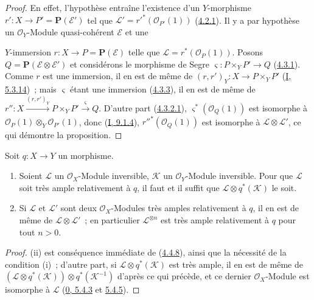 \begin{proof}
En effet, l'hypothèse entraîne l'existence d'un $Y$-morphisme
$r':X\to P'=\mathbf{P}(\mathcal{E}')$ tel que
$\mathcal{L}'=r'^*(\mathcal{O}_{P'}(1))$
(\hyperref[II.4.2.1-fr]{4.2.1}). Il y a par hypothèse un
$\mathcal{O}_Y$-Module quasi-cohérent $\mathcal{E}$ et une


$Y$-immersion $r:X\to P=\mathbf{P}(\mathcal{E})$ telle que
$\mathcal{L}=r^*(\mathcal{O}_P(1))$. Posons
$Q=\mathbf{P}(\mathcal{E}\otimes\mathcal{E}')$ et considérons le morphisme de
Segre $\varsigma:P\times_YP'\to Q$ (\hyperref[II.4.3.1-fr]{4.3.1}). Comme
$r$ est une immersion, il en est de même de
$(r,r')_Y:X\to P\times_YP'$ (\hyperref[I.5.3.14-fr]{I, 5.3.14})~; mais
$\varsigma$ étant une immersion (\hyperref[II.4.3.3-fr]{4.3.3}), il en est de
même de
$r'':X\xrightarrow{(r,r')_Y}P\times_YP'\xrightarrow{\varsigma}Q$. D'autre
part (\hyperref[II.4.3.2.1-fr]{4.3.2.1}),
$\varsigma^*(\mathcal{O}_Q(1))$ est isomorphe à
$\mathcal{O}_P(1)\otimes_Y\mathcal{O}_{P'}(1)$, donc
(\hyperref[I.9.1.4-fr]{I, 9.1.4}), $r''^*(\mathcal{O}_Q(1))$ est isomorphe à
$\mathcal{L}\otimes\mathcal{L}'$, ce qui démontre la proposition.
\end{proof}

\begin{corollary}[4.4.9]
\label{II.4.4.9-fr}
Soit $q:X\to Y$ un morphisme.
\begin{enumerate}
  \item[\rm{(i)}] Soient $\mathcal{L}$ un $\mathcal{O}_X$-Module inversible,
  $\mathcal{K}$ un $\mathcal{O}_Y$-Module inversible. Pour que $\mathcal{L}$
  soit très ample relativement à $q$, il faut et il suffit que
  $\mathcal{L}\otimes q^*(\mathcal{K})$ le soit.
  \item[\rm{(ii)}] Si $\mathcal{L}$ et $\mathcal{L}'$ sont deux
  $\mathcal{O}_X$-Modules très amples relativement à $q$, il en est de même
  de $\mathcal{L}\otimes\mathcal{L}'$~; en particulier
  $\mathcal{L}^{\otimes n}$ est très ample relativement à $q$ pour tout
  $n>0$.
\end{enumerate}
\end{corollary}

\begin{proof}
(ii) est conséquence immédiate de (\hyperref[II.4.4.8-fr]{4.4.8}), ainsi que
la nécessité de la condition (i)~; d'autre part, si
$\mathcal{L}\otimes q^*(\mathcal{K})$ est très ample, il en est de même de
$(\mathcal{L}\otimes q^*(\mathcal{K}))\otimes q^*(\mathcal{K}^{-1})$
d'après ce qui précède, et ce dernier $\mathcal{O}_X$-Module est isomorphe à
$\mathcal{L}$ (\hyperref[0.5.4.3-fr]{0, 5.4.3} et
\hyperref[0.5.4.5-fr]{5.4.5}).
\end{proof}

